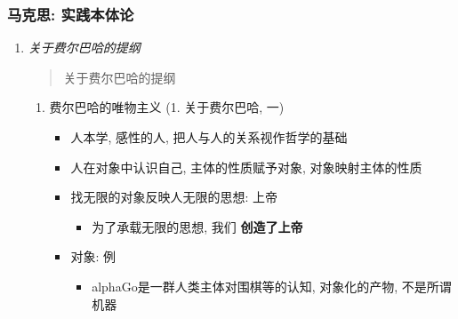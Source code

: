 \documentclass[11pt]{article}
\begin{document}
\subsubsection{马克思: 实践本体论}
\label{sec:org370beab}
\begin{enumerate}
\item \emph{关于费尔巴哈的提纲}
\label{sec:org70c2563}
\begin{quote}
关于费尔巴哈的提纲
\end{quote}
\begin{enumerate}
\item 费尔巴哈的唯物主义 (1. 关于费尔巴哈, 一)
\label{sec:org854e630}
\begin{itemize}
\item 人本学, 感性的人, 把人与人的关系视作哲学的基础
\item 人在对象中认识自己, 主体的性质赋予对象, 对象映射主体的性质
\item 找无限的对象反映人无限的思想: 上帝
\begin{itemize}
\item 为了承载无限的思想, 我们 \textbf{创造了上帝}
\end{itemize}
\item 对象: 例
\begin{itemize}
\item alphaGo是一群人类主体对围棋等的认知, 对象化的产物, 不是所谓机器
\end{itemize}
\end{itemize}


\end{enumerate}
\end{enumerate}
\end{document}
